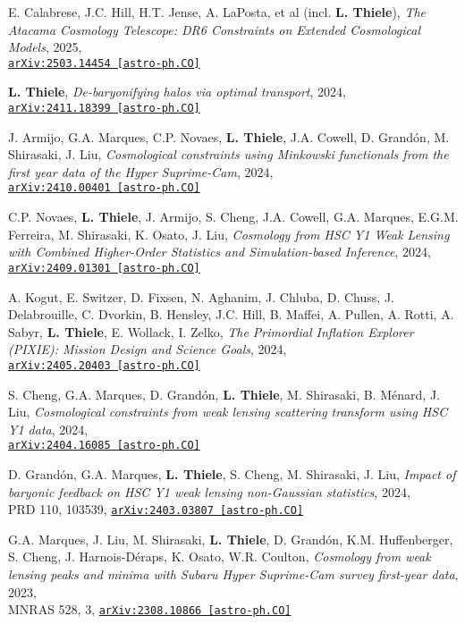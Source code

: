 E. Calabrese, J.C. Hill, H.T. Jense, A. LaPosta, et al (incl. {\bf L. Thiele}),
\emph{The Atacama Cosmology Telescope: DR6 Constraints on Extended Cosmological Models}, 2025,\\
\href{http://arxiv.org/abs/2503.14454}{\mbox{\texttt{arXiv:2503.14454 [astro-ph.CO]}}}

{\bf L. Thiele}, \emph{De-baryonifying halos via optimal transport}, 2024,\\
\href{http://arxiv.org/abs/2411.18399}{\mbox{\texttt{arXiv:2411.18399 [astro-ph.CO]}}}

J. Armijo, G.A. Marques, C.P. Novaes, {\bf L. Thiele}, J.A. Cowell, D. Grand\'on,
M. Shirasaki, J. Liu,
\emph{Cosmological constraints using Minkowski functionals from the first year
data of the Hyper Suprime-Cam}, 2024,\\
\href{https://arxiv.org/abs/2410.00401}{\mbox{\texttt{arXiv:2410.00401 [astro-ph.CO]}}}

C.P. Novaes, {\bf L. Thiele}, J. Armijo, S. Cheng, J.A. Cowell, G.A. Marques, E.G.M. Ferreira,
M. Shirasaki, K. Osato, J. Liu,
\emph{Cosmology from HSC Y1 Weak Lensing with Combined Higher-Order Statistics and
Simulation-based Inference}, 2024,\\
\href{https://arxiv.org/abs/2409.01301}{\mbox{\texttt{arXiv:2409.01301 [astro-ph.CO]}}}

A. Kogut, E. Switzer, D. Fixsen, N. Aghanim, J. Chluba, D. Chuss, J. Delabrouille,
C. Dvorkin, B. Hensley, J.C. Hill, B. Maffei, A. Pullen, A. Rotti, A. Sabyr,
{\bf L. Thiele}, E. Wollack, I. Zelko,
\emph{The Primordial Inflation Explorer (PIXIE): Mission Design and Science Goals}, 2024,\\
\href{https://arxiv.org/abs/2405.20403}{\mbox{\texttt{arXiv:2405.20403 [astro-ph.CO]}}}

S. Cheng, G.A. Marques, D. Grand\'on, {\bf L. Thiele}, M. Shirasaki, B. M\'enard, J. Liu,
\emph{Cosmological constraints from weak lensing scattering transform using HSC Y1 data}, 2024,\\
\href{https://arxiv.org/abs/2404.16085}{\mbox{\texttt{arXiv:2404.16085 [astro-ph.CO]}}}

D. Grand\'on, G.A. Marques, {\bf L. Thiele}, S. Cheng, M. Shirasaki, J. Liu,
\emph{Impact of baryonic feedback on HSC Y1 weak lensing non-Gaussian statistics}, 2024,\\
PRD 110, 103539,
\href{https://arxiv.org/abs/2403.03807}{\mbox{\texttt{arXiv:2403.03807 [astro-ph.CO]}}}

G.A. Marques, J. Liu, M. Shirasaki, {\bf L. Thiele}, D. Grand\'on, K.M. Huffenberger,
S. Cheng, J. Harnois-D\'eraps, K. Osato, W.R. Coulton,
\emph{Cosmology from weak lensing peaks and minima
      with Subaru Hyper Suprime-Cam survey first-year data}, 2023,\\
MNRAS 528, 3,
\href{https://arxiv.org/abs/2308.10866}{\mbox{\texttt{arXiv:2308.10866 [astro-ph.CO]}}}

